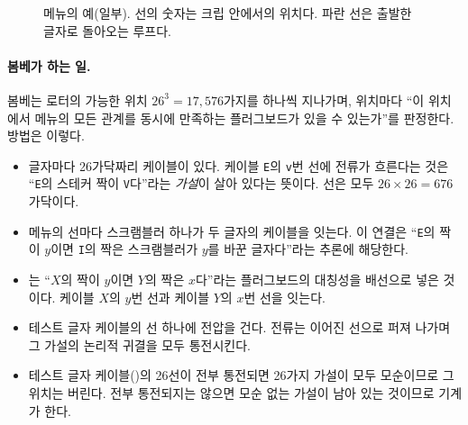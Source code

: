 \begin{figure}[ht]
\centering
{}
\caption{메뉴의 예(일부). 선의 숫자는 크립 안에서의 위치다. 파란 선은 출발한 글자로 돌아오는 루프다.}
\label{fig:g-menu}
\end{figure}

\paragraph{봄베가 하는 일.} 봄베는 로터의 가능한 위치 $26^3 = 17{,}576$가지를 하나씩 지나가며, 위치마다
``이 위치에서 메뉴의 모든 관계를 동시에 만족하는 플러그보드가 있을 수 있는가''를 판정한다. 방법은 이렇다.

\begin{itemize}
\item 글자마다 26가닥짜리 케이블이 있다. 케이블 \texttt{E}의 \texttt{v}번 선에 전류가 흐른다는 것은
``\texttt{E}의 스테커 짝이 \texttt{V}다''라는 \emph{가설}이 살아 있다는 뜻이다. 선은 모두
$26\times26 = 676$가닥이다.
\item 메뉴의 선마다 스크램블러 하나가 두 글자의 케이블을 잇는다. 이 연결은 ``\texttt{E}의 짝이 $y$이면
\texttt{I}의 짝은 스크램블러가 $y$를 바꾼 글자다''라는 추론에 해당한다.
\item {}는 ``$X$의 짝이 $y$이면 $Y$의 짝은 $x$다''라는 플러그보드의 대칭성을
배선으로 넣은 것이다. 케이블 $X$의 $y$번 선과 케이블 $Y$의 $x$번 선을 잇는다.
\item 테스트 글자 케이블의 선 하나에 전압을 건다. 전류는 이어진 선으로 퍼져 나가며 그 가설의 논리적
귀결을 모두 통전시킨다.
\item 테스트 글자 케이블()의 26선이 전부 통전되면 26가지 가설이 모두
모순이므로 그 위치는 버린다. 전부 통전되지는 않으면 모순 없는 가설이 남아 있는 것이므로 기계가
한다.
\end{itemize}

